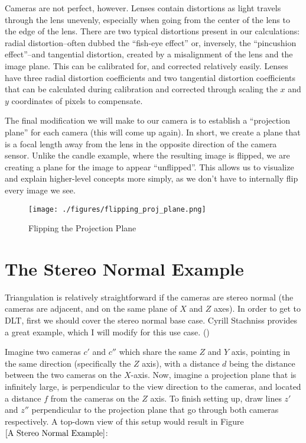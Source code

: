 \documentclass[
    12pt,
    twoside,
    bibstyle=chicago,
    headerstyle=uppercase,
	bibfile=thesis_updating.bib
]{reedthesis}
\begin{document}
Cameras are not perfect, however. Lenses contain distortions as light travels through the lens unevenly, especially when going from the center of the lens to the edge of the lens. There are two typical distortions present in our calculations: radial distortion--often dubbed the “fish-eye effect” or, inversely, the “pincushion effect”--and tangential distortion, created by a misalignment of the lens and the image plane. This can be calibrated for, and corrected relatively easily. Lenses have three radial distortion coefficients and two tangential distortion coefficients that can be calculated during calibration and corrected through scaling the $x$ and $y$ coordinates of pixels to compensate.


The final modification we will make to our camera is to establish a “projection plane” for each camera (this will come up again). In short, we create a plane that is a focal length away from the lens in the opposite direction of the camera sensor. Unlike the candle example, where the resulting image is flipped, we are creating a plane for the image to appear “unflipped”. This allows us to visualize and explain higher-level concepts more simply, as we don't have to internally flip every image we see.

\begin{figure}[h]
	    \centering
	    \texttt{[image: ./figures/flipping\_proj\_plane.png]}
		
	    \caption{Flipping the Projection Plane}
	 \label{Flipping the Projection Plane}
	\end{figure}

\section{The Stereo Normal Example}

Triangulation is relatively straightforward if the cameras are stereo normal (the cameras are adjacent, and on the same plane of $X$ and $Z$ axes). In order to get to DLT, first we should cover the stereo normal base case. Cyrill Stachniss provides a great example, which I will modify for this use case. (\autocite{stachnissLecturePhotogrammetryII2021})

	Imagine two cameras $c'$ and $c''$ which share the same $Z$ and $Y$ axis, pointing in the same direction (specifically the $Z$ axis), with a distance $d$ being the distance between the two cameras on the $X$-axis. Now, imagine a projection plane that is infinitely large, is perpendicular to the view direction to the cameras, and located a distance $f$ from the cameras on the $Z$ axis. To finish setting up, draw lines $z'$ and $z''$ perpendicular to the projection plane that go through both cameras respectively. A top-down view of this setup would result in Figure $\ref{A Stereo Normal Example}$: 
	
\end{document}
